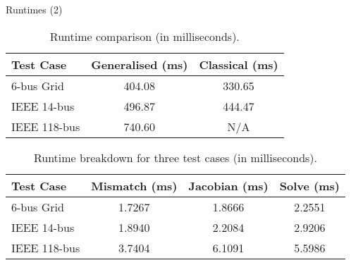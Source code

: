 \begin{frame}{Runtimes (2)}

    \begin{table}[H]
        \centering
        \caption{Runtime comparison (in milliseconds).}
        \begin{tabular}{|l|c|c|}
        \hline
        \textbf{Test Case} & \textbf{Generalised (ms)} & \textbf{Classical (ms)} \\ \hline
        6-bus Grid    & 404.08   & 330.65 \\ \hline
        IEEE 14-bus   & 496.87   & 444.47 \\ \hline
        IEEE 118-bus  & 740.60   & N/A    \\ \hline
        \end{tabular}
        \label{tab:runtime_comparison}
    \end{table}

    \begin{table}[H]
        \centering
        \caption{Runtime breakdown for three test cases (in milliseconds).}
        \begin{tabular}{|l|c|c|c|}
        \hline
        \textbf{Test Case} & \textbf{Mismatch (ms)} & \textbf{Jacobian (ms)} & \textbf{Solve (ms)} \\ \hline
        6-bus Grid    & 1.7267   & 1.8666   & 2.2551    \\ \hline
        IEEE 14-bus   & 1.8940   & 2.2084   & 2.9206    \\ \hline
        IEEE 118-bus  & 3.7404   & 6.1091   & 5.5986    \\ \hline
        \end{tabular}
        \label{tab:runtime_breakdown}
    \end{table}

\end{frame}

